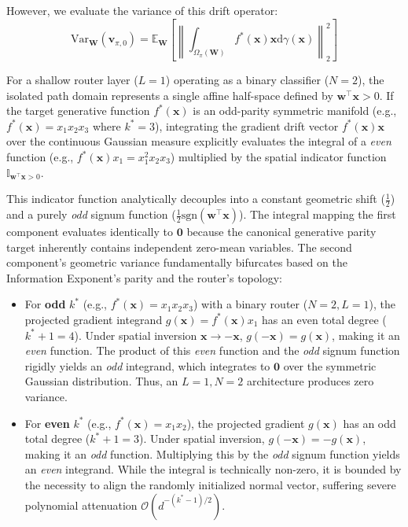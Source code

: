 \documentclass{article}
\newcommand{\E}{\mathbb{E}}
\newcommand{\1}{\mathbb{I}}
\newcommand{\diff}{\mathrm{d}}
\newcommand{\norm}[1]{\left\lVert#1\right\rVert}
\newcommand{\calO}{\mathcal{O}}
\newcommand{\bx}{\mathbf{x}}
\newcommand{\bw}{\mathbf{w}}
\newcommand{\bv}{\mathbf{v}}
\newcommand{\bW}{\mathbf{W}}
\newcommand{\sgn}{\mathrm{sgn}}
\begin{document}
However, we evaluate the variance of this drift operator:
\begin{equation}
    \text{Var}_\bW(\bv_{\pi, 0}) = \E_\bW \left[ \norm{ \int_{\Omega_\pi(\bW)} f^*(\bx) \bx \diff\gamma(\bx) }_2^2 \right]
\end{equation}

For a shallow router layer ($L=1$) operating as a binary classifier ($N=2$), the isolated path domain represents a single affine half-space defined by $\bw^\top \bx > 0$. If the target generative function $f^*(\bx)$ is an odd-parity symmetric manifold (e.g., $f^*(\bx) = x_1 x_2 x_3$ where $k^*=3$), integrating the gradient drift vector $f^*(\bx)\bx$ over the continuous Gaussian measure explicitly evaluates the integral of a \textit{even} function (e.g., $f^*(\bx)x_1 = x_1^2 x_2 x_3$) multiplied by the spatial indicator function $\1_{\bw^\top \bx > 0}$. 

This indicator function analytically decouples into a constant geometric shift ($\frac{1}{2}$) and a purely \textit{odd} signum function ($\frac{1}{2}\sgn(\bw^\top \bx)$). The integral mapping the first component evaluates identically to $\mathbf{0}$ because the canonical generative parity target inherently contains independent zero-mean variables. The second component's geometric variance fundamentally bifurcates based on the Information Exponent's parity and the router's topology:
\begin{itemize}[leftmargin=2em]
    \item For \textbf{odd} $k^*$ (e.g., $f^*(\bx) = x_1 x_2 x_3$) with a binary router ($N=2, L=1$), the projected gradient integrand $g(\bx) = f^*(\bx)x_1$ has an even total degree ($k^*+1 = 4$). Under spatial inversion $\bx \to -\bx$, $g(-\bx) = g(\bx)$, making it an \textit{even} function. The product of this \textit{even} function and the \textit{odd} signum function rigidly yields an \textit{odd} integrand, which integrates to $\mathbf{0}$ over the symmetric Gaussian distribution. Thus, an $L=1, N=2$ architecture produces zero variance.
    \item For \textbf{even} $k^*$ (e.g., $f^*(\bx) = x_1 x_2$), the projected gradient $g(\bx)$ has an odd total degree ($k^*+1 = 3$). Under spatial inversion, $g(-\bx) = -g(\bx)$, making it an \textit{odd} function. Multiplying this by the \textit{odd} signum function yields an \textit{even} integrand. While the integral is technically non-zero, it is bounded by the necessity to align the randomly initialized normal vector, suffering severe polynomial attenuation $\calO(d^{-(k^*-1)/2})$.
\end{itemize}
\end{document}
